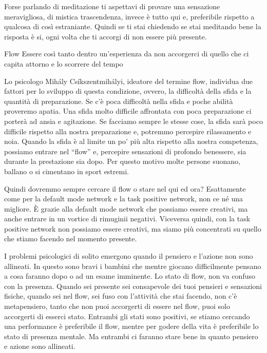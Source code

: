 \documentclass[12pt]{book} %
\begin{document}
Forse parlando di meditazione ti aspettavi di provare una sensazione meravigliosa, di mistica trascendenza, invece è
tutto qui e, preferibile rispetto a qualcosa di così estraniante. Quindi se ti stai chiedendo se stai meditando bene la
risposta è si, ogni volta che ti accorgi di non essere più presente.

\begin{mdframed}[linewidth=1pt]
Flow
Essere così tanto dentro un'esperienza da non accorgerci di quello che ci capita attorno e lo scorrere del tempo

Lo psicologo Mihály Csíkszentmihályi, ideatore del termine flow, individua due fattori per lo sviluppo di questa
condizione, ovvero, la difficoltà della sfida e la quantità di preparazione. Se c'è poca
difficoltà nella sfida e poche abilità proveremo apatia. Una sfida molto difficile affrontata con poca preparazione ci
porterà ad ansia e agitazione. Se facciamo sempre le stesse cose, la sfida sarà poco difficile rispetto alla nostra
preparazione e, potremmo percepire rilassamento e noia. Quando la sfida è al limite un po'
più alta rispetto alla nostra competenza, possiamo entrare nel “flow” e, percepire sensazioni di profondo benessere,
sia durante la prestazione sia dopo. Per questo motivo molte persone suonano, ballano o si cimentano in sport estremi.

Quindi dovremmo sempre cercare il flow o stare nel qui ed ora? 
Esattamente come per la default mode network e la task positive network, non ce né una
migliore. È grazie alla default mode network che possiamo essere creativi, ma anche entrare in un vortice di rimuginii
negativi. Viceversa quindi, con la task positive network non possiamo essere creativi, ma siamo più concentrati su
quello che stiamo facendo nel momento presente.

I problemi psicologici di solito emergono quando il pensiero e l'azione non sono allineati. In questo sono bravi i bambini che mentre giocano difficilmente pensano a cosa faranno dopo o ad un esame imminente. Lo stato di flow, non va confuso con la presenza. Quando sei presente sei consapevole dei tuoi pensieri e sensazioni fisiche, quando sei nel flow, sei fuso con l'attività che stai facendo, non c'è metapensiero, tanto che non puoi accorgerti di essere nel flow, puoi solo accorgerti di esserci stato. Entrambi gli stati sono positivi, se stiamo cercando una performance è preferibile il flow, mentre per godere della vita è preferibile lo stato di presenza mentale. Ma entrambi ci faranno stare bene in quanto pensiero e azione sono allineati.
\end{mdframed}
\end{document}
